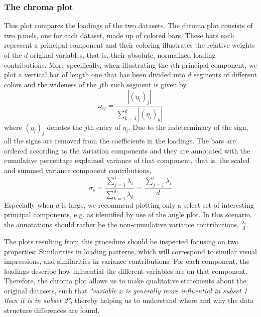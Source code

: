 \documentclass[titlepage,11pt,twoside]{article}
\begin{document}
\subsubsection{The chroma plot}
This plot compares the loadings of the two datasets. The chroma plot consists of two panels, one for each dataset, made up of colored bars. These bars each represent a principal component and their coloring illustrates the relative weights of the $d$ original variables, that is, their absolute, normalized loading contributions. More specifically, when illustrating the $i$th principal component, we plot a vertical bar of length one that has been divided into $d$ segments of different colors and the wideness of the $j$th such segment is given by 
$$\omega_{ij} = \frac{|(\eta_i)_j|}{\sum_{k=1}^d |(\eta_i)_k|}$$
where $(\eta_i)_j$ denotes the $j$th entry of $\eta_i$. Due to the indeterminacy of the sign, all the signs are removed from the coefficients in the loadings. The bars are ordered according to the variation components and they are annotated with the cumulative percentage explained variance of that component, that is, the scaled and summed variance component contributions,
$$\sigma_c = \frac{\sum_{j = 1}^i \lambda_i}{\sum_{k=1}^d \lambda_k} = \frac{\sum_{j = 1}^i \lambda_i}{d}$$
Especially when $d$ is large, we recommend plotting only a select set of interesting principal components, e.g. as identified by use of the angle plot. In this scenario, the annotations should rather be the non-cumulative variance contributions, $\frac{\lambda_i}{d}$. 

The plots resulting from this procedure should be inspected focusing on two properties: Similarities in loading patterns, which will correspond to similar visual impressions, and similarities in variance contributions. For each component, the loadings describe how influential the different variables are on that component. Therefore, the chroma plot allows us to make qualitative statements about the original datasets, such that \textit{"variable $x$ is generally more influential in subset 1 than it is in subset 2"}, thereby helping us to understand where and why the data structure differences are found. 
\end{document}
